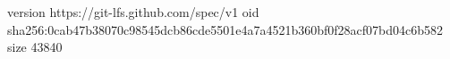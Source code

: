 version https://git-lfs.github.com/spec/v1
oid sha256:0cab47b38070c98545dcb86cde5501e4a7a4521b360bf0f28acf07bd04c6b582
size 43840
